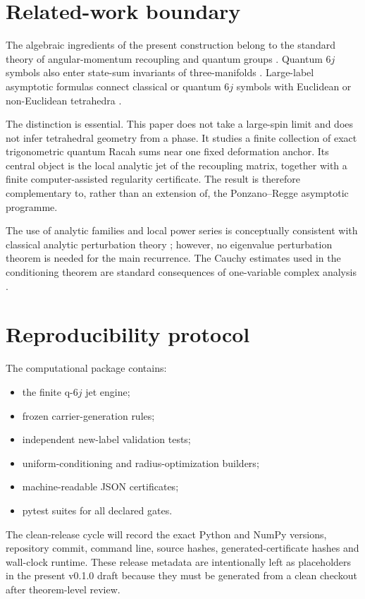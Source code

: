 \section{Related-work boundary}
The algebraic ingredients of the present construction belong to the standard theory of angular-momentum recoupling and quantum groups \cite{biedenharnLouck1981,kirillovReshetikhin1989}.  Quantum $6j$ symbols also enter state-sum invariants of three-manifolds \cite{turaevViro1992}.  Large-label asymptotic formulas connect classical or quantum $6j$ symbols with Euclidean or non-Euclidean tetrahedra \cite{ponzanoRegge1968,roberts1999,taylorWoodward2005}.

The distinction is essential.  This paper does not take a large-spin limit and does not infer tetrahedral geometry from a phase.  It studies a finite collection of exact trigonometric quantum Racah sums near one fixed deformation anchor.  Its central object is the local analytic jet of the recoupling matrix, together with a finite computer-assisted regularity certificate.  The result is therefore complementary to, rather than an extension of, the Ponzano--Regge asymptotic programme.

The use of analytic families and local power series is conceptually consistent with classical analytic perturbation theory \cite{kato1995}; however, no eigenvalue perturbation theorem is needed for the main recurrence.  The Cauchy estimates used in the conditioning theorem are standard consequences of one-variable complex analysis \cite{ahlfors1979}.

\section{Reproducibility protocol}
The computational package contains:
\begin{itemize}[leftmargin=2em]
\item the finite q-$6j$ jet engine;
\item frozen carrier-generation rules;
\item independent new-label validation tests;
\item uniform-conditioning and radius-optimization builders;
\item machine-readable JSON certificates;
\item pytest suites for all declared gates.
\end{itemize}

The clean-release cycle will record the exact Python and NumPy versions, repository commit, command line, source hashes, generated-certificate hashes and wall-clock runtime.  These release metadata are intentionally left as placeholders in the present v0.1.0 draft because they must be generated from a clean checkout after theorem-level review.

